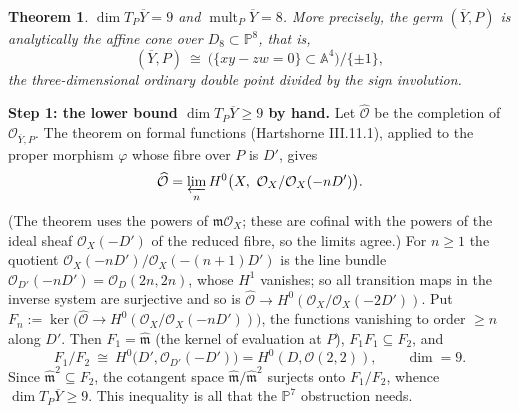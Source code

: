 \documentclass[10pt,a4paper]{article}
\theoremstyle{plain}
\newtheorem{theorem}{Theorem}[section]
\theoremstyle{definition}
\theoremstyle{remark}
\begin{document}
\begin{theorem}\label{thm:tangent}
$\dim T_P\overline{Y}=9$ and $\operatorname{mult}_P\overline{Y}=8$.
More precisely, the germ $(\overline{Y},P)$ is analytically the
affine cone over $D_8\subset\mathbb{P}^8$, that is,
$$
(\overline{Y},P)\ \cong\ \bigl(\{xy-zw=0\}\subset\mathbb{A}^4\bigr)/\{\pm 1\},
$$
the three-dimensional ordinary double point divided by the sign
involution.
\end{theorem}

\noindent\textbf{Step 1: the lower bound $\dim T_P\overline{Y}\ge 9$
by hand.}
Let $\widehat{\mathcal{O}}$ be the completion of
$\mathcal{O}_{\overline{Y},P}$. The theorem on formal functions
(Hartshorne III.11.1), applied to the proper morphism $\varphi$
whose fibre over $P$ is $D'$, gives
$$
\widehat{\mathcal{O}}=\varprojlim_n
H^0\bigl(X,\ \mathcal{O}_X/\mathcal{O}_X(-nD')\bigr).
$$
(The theorem uses the powers of $\mathfrak{m}\mathcal{O}_X$; these
are cofinal with the powers of the ideal sheaf $\mathcal{O}_X(-D')$
of the reduced fibre, so the limits agree.) For $n\ge 1$ the
quotient $\mathcal{O}_X(-nD')/\mathcal{O}_X(-(n+1)D')$ is the line
bundle $\mathcal{O}_{D'}(-nD')=\mathcal{O}_D(2n,2n)$, whose $H^1$
vanishes; so all transition maps in the inverse system are
surjective and so is $\widehat{\mathcal{O}}\to
H^0(\mathcal{O}_X/\mathcal{O}_X(-2D'))$. Put
$F_n:=\ker\bigl(\widehat{\mathcal{O}}\to
H^0(\mathcal{O}_X/\mathcal{O}_X(-nD'))\bigr)$, the functions
vanishing to order $\ge n$ along $D'$. Then $F_1=\widehat{\mathfrak{m}}$
(the kernel of evaluation at $P$), $F_1F_1\subseteq F_2$, and
$$
F_1/F_2\ \cong\ H^0\bigl(D',\mathcal{O}_{D'}(-D')\bigr)
= H^0(D,\mathcal{O}(2,2)),\qquad \dim = 9 .
$$
Since $\widehat{\mathfrak{m}}^2\subseteq F_2$, the cotangent space
$\widehat{\mathfrak{m}}/\widehat{\mathfrak{m}}^2$ surjects onto
$F_1/F_2$, whence $\dim T_P\overline{Y}\ge 9$. This inequality is
all that the $\mathbb{P}^7$ obstruction needs.
\end{document}
